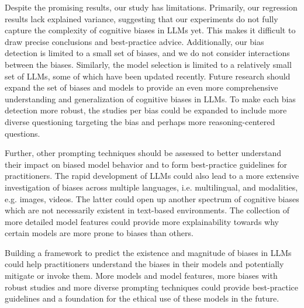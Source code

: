 \par Despite the promising results, our study has limitations. Primarily, our regression results lack explained variance, suggesting that our experiments do not fully capture the complexity of cognitive biases in LLMs yet. This makes it difficult to draw precise conclusions and best-practice advice. Additionally, our bias detection is limited to a small set of biases, and we do not consider interactions between the biases. Similarly, the model selection is limited to a relatively small set of LLMs, some of which have been updated recently. Future research should expand the set of biases and models to provide an even more comprehensive understanding and generalization of cognitive biases in LLMs. To make each bias detection more robust, the studies per bias could be expanded to include more diverse questioning targeting the bias and perhaps more reasoning-centered questions.

\par Further, other prompting techniques should be assessed to better understand their impact on biased model behavior and to form best-practice guidelines for practitioners. The rapid development of LLMs could also lead to a more extensive investigation of biases across multiple languages, i.e. multilingual, and modalities, e.g. images, videos. The latter could open up another spectrum of cognitive biases which are not necessarily existent in text-based environments. The collection of more detailed model features could provide more explainability towards why certain models are more prone to biases than others.

\par Building a framework to predict the existence and magnitude of biases in LLMs could help practitioners understand the biases in their models and potentially mitigate or invoke them. More models and model features, more biases with robust studies and more diverse prompting techniques could provide best-practice guidelines and a foundation for the ethical use of these models in the future.
